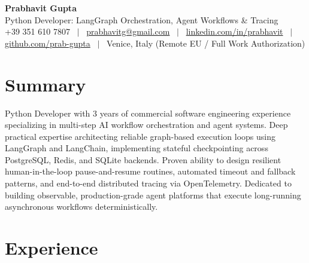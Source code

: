 \documentclass[a4paper,10pt]{article}
\begin{document}
\begin{minipage}[c]{0.80\textwidth}
 {\Huge\bfseries Prabhavit Gupta}\\[3pt]
 {\color{accent}\large Python Developer: LangGraph Orchestration, Agent Workflows \& Tracing}\\[6pt]
 {\footnotesize +39 351 610 7807 ~$\vert$~
 \href{mailto:prabhavitg@gmail.com}{prabhavitg@gmail.com} ~$\vert$~
 \href{https://www.linkedin.com/in/prabhavit/}{linkedin.com/in/prabhavit} ~$\vert$~
 \href{https://github.com/prab-gupta}{github.com/prab-gupta} ~$\vert$~
 Venice, Italy (Remote EU / Full Work Authorization)}
\end{minipage}\hfill

\section{Summary}
Python Developer with 3 years of commercial software engineering experience specializing in multi-step AI workflow orchestration and agent systems. Deep practical expertise architecting reliable graph-based execution loops using LangGraph and LangChain, implementing stateful checkpointing across PostgreSQL, Redis, and SQLite backends. Proven ability to design resilient human-in-the-loop pause-and-resume routines, automated timeout and fallback patterns, and end-to-end distributed tracing via OpenTelemetry. Dedicated to building observable, production-grade agent platforms that execute long-running asynchronous workflows deterministically.

\section{Experience}
\end{document}
